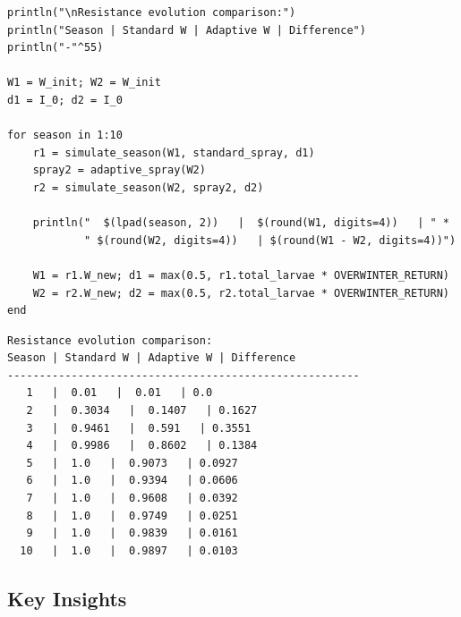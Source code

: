 \label{8535820276614388082}{}



\begin{verbatim}
println("\nResistance evolution comparison:")
println("Season | Standard W | Adaptive W | Difference")
println("-"^55)

W1 = W_init; W2 = W_init
d1 = I_0; d2 = I_0

for season in 1:10
    r1 = simulate_season(W1, standard_spray, d1)
    spray2 = adaptive_spray(W2)
    r2 = simulate_season(W2, spray2, d2)

    println("  $(lpad(season, 2))   |  $(round(W1, digits=4))   | " *
            " $(round(W2, digits=4))   | $(round(W1 - W2, digits=4))")

    W1 = r1.W_new; d1 = max(0.5, r1.total_larvae * OVERWINTER_RETURN)
    W2 = r2.W_new; d2 = max(0.5, r2.total_larvae * OVERWINTER_RETURN)
end
\end{verbatim}




\begin{verbatim}
Resistance evolution comparison:
Season | Standard W | Adaptive W | Difference
-------------------------------------------------------
   1   |  0.01   |  0.01   | 0.0
   2   |  0.3034   |  0.1407   | 0.1627
   3   |  0.9461   |  0.591   | 0.3551
   4   |  0.9986   |  0.8602   | 0.1384
   5   |  1.0   |  0.9073   | 0.0927
   6   |  1.0   |  0.9394   | 0.0606
   7   |  1.0   |  0.9608   | 0.0392
   8   |  1.0   |  0.9749   | 0.0251
   9   |  1.0   |  0.9839   | 0.0161
  10   |  1.0   |  0.9897   | 0.0103
\end{verbatim}



\subsection{Key Insights}



\label{7549919537174593161}{}


